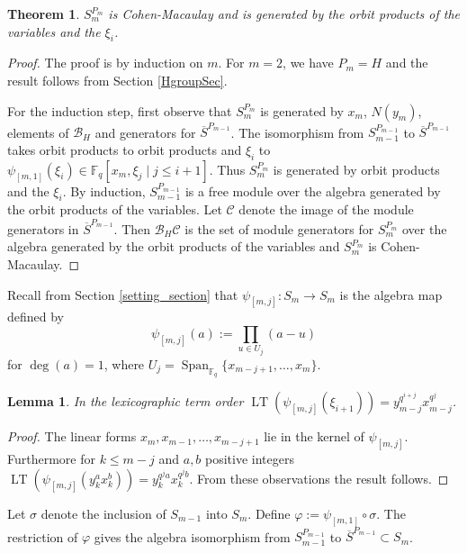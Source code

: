 \documentclass{amsart}
\newcommand{\field}{\mathbb{F}}
\newcommand{\BH}{\mathcal{B}_H}
\newtheorem{thm}[subsection]{Theorem}
\newtheorem{lem}[subsection]{Lemma}
\DeclareMathOperator{\Span}{Span}
\DeclareMathOperator{\lt}{LT}
\begin{document}
\begin{thm}\label{sylow_thm}
  $S_m^{P_m}$ is Cohen-Macaulay and is generated by the orbit products of the variables and the $\xi_{i}$.
  \end{thm}
 \begin{proof}
 The proof is by induction on $m$. For $m=2$, we have $P_m=H$ and the result follows from Section \ref{HgroupSec}.

For the induction step, first observe that $S_m^{P_m}$ is generated by $x_m$, $N(y_m)$, elements of $\BH$ and generators for $\overline{S}^{P_{m-1}}$.
 The isomorphism from $S_{m-1}^{P_{m-1}}$ to $\overline{S}^{P_{m-1}}$ takes orbit products to orbit products and $\xi_{i}$ to
 $\psi_{[m,1]}(\xi_{i})\in\field_q[x_m,\xi_{j}\mid j\leq i+1]$.
 Thus $S_m^{P_m}$ is generated by orbit products and the $\xi_{i}$. By induction, $S_{m-1}^{P_{m-1}}$ is a free module
 over the algebra generated by the orbit products of the variables. Let $\mathcal{C}$ denote the image of the module generators in $\overline{S}^{P_{m-1}}$.
 Then $\BH\mathcal{C}$ is the set of module generators for  $S_m^{P_m}$ over the algebra generated by the orbit products of the variables and $S_m^{P_m}$ is Cohen-Macaulay.
 \end{proof}
 
Recall from Section \ref{setting_section} that $\psi_{[m,j]}:S_m\to S_m$ is the algebra map defined by
$$\psi_{[m,j]}(a):=\prod_{u\in U_j}(a-u)$$
for $\deg(a)=1$, where $U_j = \Span_{\field_q}\{x_{m-j+1},\ldots,x_m \}$.

\begin{lem}\label{lt of elements}
In the lexicographic term order
    $\lt(\psi_{[m,j]}(\xi_{i+1})) = y_{m-j}^{q^{i+j}} x_{m-j}^{q^j}$.
\end{lem}
\begin{proof}
    The linear forms $x_m,x_{m-1},\dots,x_{m-j+1}$ lie in the kernel
of $\psi_{[m,j]}$.  Furthermore for $k \leq m-j$ and $a,b$ positive integers $\lt(\psi_{[m,j]}(y_k^a x_k^b )) = y_k^{q^ja} x_k^{q^j b}$.  From these observations the result follows.
\end{proof}


Let $\sigma$ denote the inclusion of $S_{m-1}$ into $S_m$.
Define $\varphi:=\psi_{[m,1]}\circ\sigma$. The restriction of $\varphi$ gives the algebra isomorphism from $S_{m-1}^{P_{m-1}}$ to $\overline{S}^{{P_{m-1}}}\subset S_m$.
\end{document}
